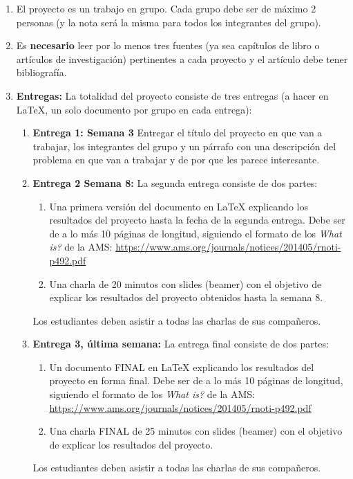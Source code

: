 \documentclass[11pt]{article}
\begin{document}
\begin{enumerate}
    \item El proyecto es un trabajo en grupo. Cada grupo debe ser de máximo 2 personas (y la nota será la misma para todos los integrantes del grupo).

    \item Es {\bf necesario} leer por lo menos tres fuentes (ya sea capítulos de libro o artículos de investigación) pertinentes a cada proyecto y el artículo debe tener bibliografía.

    \item \textbf{Entregas:} La totalidad del proyecto consiste de tres entregas (a hacer en \LaTeX, un solo documento por grupo en cada entrega):
    
    \begin{enumerate}[label=\alph*)]
        \item \textbf{Entrega 1: Semana 3} Entregar el título del proyecto en que van a trabajar, los integrantes del grupo y un párrafo con una descripción del problema en que van a trabajar y de por que les parece interesante.        
        \item \textbf{Entrega 2 Semana 8:} La segunda entrega consiste de dos partes:
        \begin{enumerate}
            \item Una primera versión del documento en \LaTeX{} explicando los resultados del proyecto hasta la fecha de la segunda entrega. Debe ser de a lo más 10 páginas de longitud, siguiendo el formato de los \textit{What is?} de la AMS: \url{https://www.ams.org/journals/notices/201405/rnoti-p492.pdf}
            \item Una charla de 20 minutos con slides (beamer) con el objetivo de explicar los resultados del proyecto obtenidos hasta la semana $8$.            
        \end{enumerate}
            Los estudiantes deben asistir a todas las charlas de sus compañeros.

        \item \textbf{Entrega 3, última semana:} La entrega final consiste de dos partes:
        \begin{enumerate}
            \item Un documento FINAL en \LaTeX{} explicando los resultados del proyecto en forma final. Debe ser de a lo más 10 páginas de longitud, siguiendo el formato de los \textit{What is?} de la AMS: \url{https://www.ams.org/journals/notices/201405/rnoti-p492.pdf}
            \item Una charla FINAL de 25 minutos con slides (beamer) con el objetivo de explicar los resultados del proyecto.            
        \end{enumerate}
            Los estudiantes deben asistir a todas las charlas de sus compañeros.
            
            
    \end{enumerate}
\end{enumerate}
\end{document}
